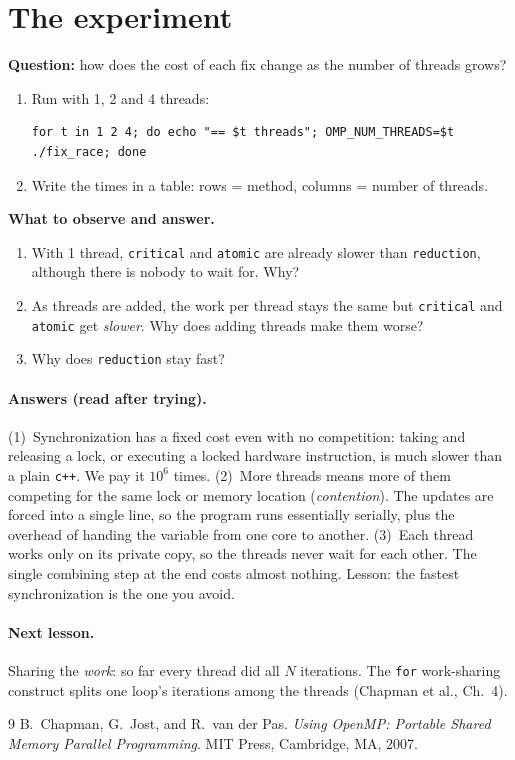 \documentclass[11pt,a4paper]{article}
\begin{document}
\section{The experiment}
\begin{experiment}
\textbf{Question:} how does the cost of each fix change as the number of threads grows?
\begin{enumerate}
  \item Run with 1, 2 and 4 threads:
\begin{lstlisting}[style=sh]
for t in 1 2 4; do echo "== $t threads"; OMP_NUM_THREADS=$t ./fix_race; done
\end{lstlisting}
  \item Write the times in a table: rows = method, columns = number of threads.
\end{enumerate}
\textbf{What to observe and answer.}
\begin{enumerate}
  \item With 1 thread, \texttt{critical} and \texttt{atomic} are already slower than
        \texttt{reduction}, although there is nobody to wait for. Why?
  \item As threads are added, the work per thread stays the same but \texttt{critical}
        and \texttt{atomic} get \emph{slower}. Why does adding threads make them worse?
  \item Why does \texttt{reduction} stay fast?
\end{enumerate}
\end{experiment}

\paragraph{Answers (read after trying).}
(1)~Synchronization has a fixed cost even with no competition: taking and releasing a
lock, or executing a locked hardware instruction, is much slower than a plain
\texttt{c++}. We pay it $10^6$ times.
(2)~More threads means more of them competing for the same lock or memory location
(\emph{contention}). The updates are forced into a single line, so the program runs
essentially serially, plus the overhead of handing the variable from one core to another.
(3)~Each thread works only on its private copy, so the threads never wait for each other.
The single combining step at the end costs almost nothing. Lesson: the fastest
synchronization is the one you avoid.

\paragraph{Next lesson.} Sharing the \emph{work}: so far every thread did all $N$
iterations. The \texttt{for} work-sharing construct splits one loop's iterations among
the threads (Chapman et al., Ch.~4).

\begin{thebibliography}{9}
 B.~Chapman, G.~Jost, and R.~van der Pas. \emph{Using OpenMP: Portable
  Shared Memory Parallel Programming}. MIT Press, Cambridge, MA, 2007.
\end{thebibliography}
\end{document}

